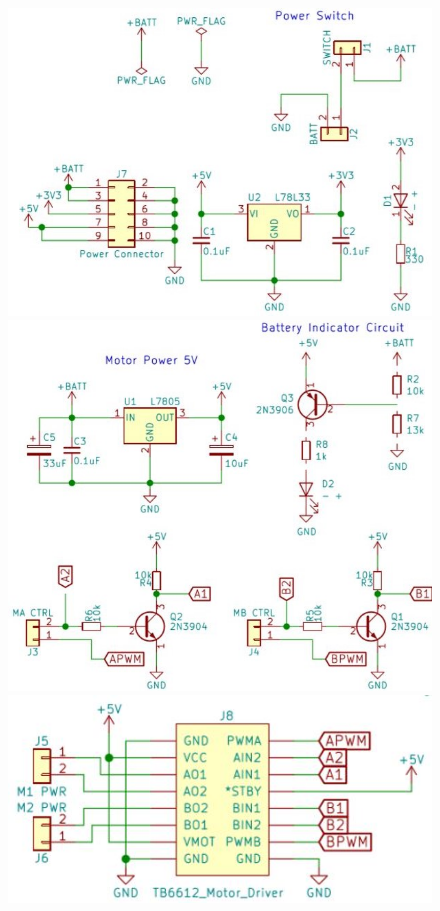 \documentclass{handout}
\begin{document}
	\begin{figure} [htb]
		\centering
		\includegraphics[width=.65\textwidth]{schematic1.jpg}
		
		\vspace{0cm}
		
		\includegraphics[width=.65\textwidth]{schematic2.jpg}
		
		\vspace{0cm}
		
		\includegraphics[width=.65\textwidth]{schematic3.jpg}
	\end{figure}
\end{document}
